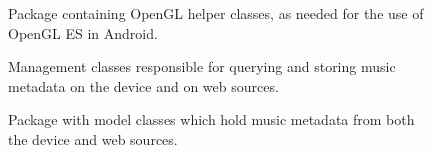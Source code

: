 \begin{figure}[H]
  \centering
  \caption{Package containing OpenGL helper classes, as needed for the use of OpenGL ES in Android.}
  \label{fig:package-glhelper}
\end{figure}

\begin{figure}[H]
  \centering
  \caption{Management classes responsible for querying and storing music metadata on the device and on web sources.}
  \label{fig:package-manager}
\end{figure}

\begin{figure}[H]
  \centering
  \caption{Package with model classes which hold music metadata from both the device and web sources.}
  \label{fig:package-model}
\end{figure}

